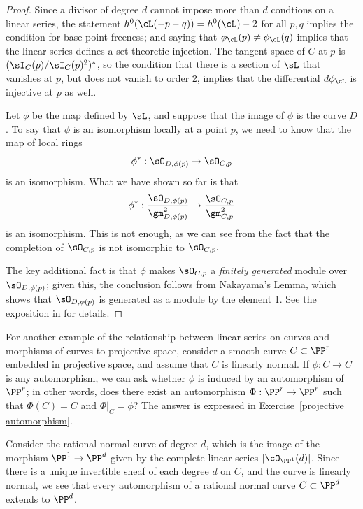 \begin{proof}
Since a divisor of degree $d$ cannot impose more than $d$ condtions on a linear series, the statement $h^0(\cL(-p-q)) = h^0(\cL) - 2$ for all $p, q$ implies the condition for base-point freeness; and saying that $\phi_\cL(p) \neq \phi_\cL(q)$ implies that the linear series defines a set-theoretic injection. The tangent space of $C$ at $p$ is $(\sI_C(p)/\sI_C(p)^2)^*$, so the condition that there is a section of $\sL$ that vanishes at $p$, but does not vanish
to order 2, implies that the differential $d\phi_\cL$ is injective at $p$ as well.

Let $\phi$ be the map defined by $\sL$, and suppose that the image of $\phi$ is the curve $D$. To say that $\phi$  is an isomorphism locally at a point $p$, we need to know that the map of local rings
$$
\phi^*: \sO_{D,\phi(p)} \to \sO_{C,p}
$$
is an isomorphism. What we have shown so far is that 
$$
\phi^*: \frac{\sO_{D,\phi(p)}}{\gm_{D,\phi(p)}^2} \to \frac{\sO_{C,p}}{\gm_{C,p}^2}
$$
is an isomorphism. This is not enough, as we can see from the fact that the completion of $\sO_{C,p}$ is not
isomorphic to $\sO_{C,p}.$

The key additional fact is that $\phi$ makes $\sO_{C,p}$  a \emph{finitely generated} module over 
$\sO_{D,\phi(p)}$;
given this, the conclusion follows from Nakayama's Lemma, which shows that
$\sO_{D,\phi(p)}$ is generated as a module by the element 1.
See the exposition in \cite[Proposition 7.3 and Lemma 7.4]{H} for details.
\end{proof}


For another example of the relationship between linear series on curves and morphisms of curves to projective space, consider a smooth curve $C \subset \PP^r$ embedded in projective space, and assume that $C$ is linearly normal. If $\phi : C \to C$ is any automorphism, we can ask whether $\phi$ is induced by an automorphism of $\PP^r$; in other words, does there exist an automorphism $\Phi : \PP^r \to \PP^r$ such that $\Phi(C) = C$ and $\Phi|_C = \phi$? The answer is expressed in Exercise~\ref{projective automorphism}.


\begin{example}
Consider the rational normal curve of degree $d$, which is the image of the morphism $\PP^1\to \PP^d$ given by the complete linear series $|\cO_{\PP^1}(d)|$. Since there is a unique invertible sheaf of each degree $d$ on $C$, and the curve is linearly normal, we see that every automorphism of a rational normal curve $C \subset \PP^d$  extends to $\PP^d$.
\end{example}

